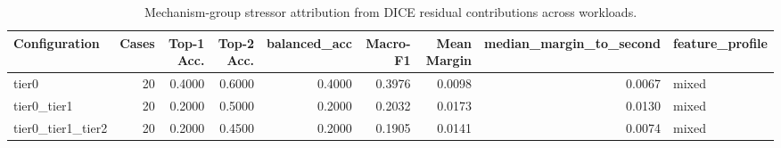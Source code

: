 \begin{table}[t]
\centering
\caption{Mechanism-group stressor attribution from DICE residual contributions across workloads.}
\label{tab:dice_stressor_diagnosis}
\footnotesize
\begin{tabular}{lrrrrrrrl}
\toprule
Configuration & Cases & Top-1 Acc. & Top-2 Acc. & balanced_acc & Macro-F1 & Mean Margin & median_margin_to_second & feature_profile \\
\midrule
tier0 & 20 & 0.4000 & 0.6000 & 0.4000 & 0.3976 & 0.0098 & 0.0067 & mixed \\
tier0_tier1 & 20 & 0.2000 & 0.5000 & 0.2000 & 0.2032 & 0.0173 & 0.0130 & mixed \\
tier0_tier1_tier2 & 20 & 0.2000 & 0.4500 & 0.2000 & 0.1905 & 0.0141 & 0.0074 & mixed \\
\bottomrule
\end{tabular}

\end{table}

